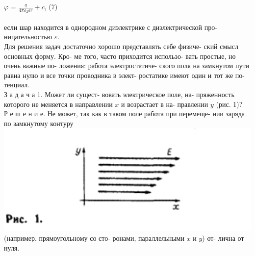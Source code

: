 \documentclass{memoir}
\begin{document}
\begin{multicols}{2}
\begin{small}
\begin{justify}

\parindent50pt
\indent $\varphi$ = $\frac{q}{4 \pi \varepsilon_2 \varepsilon r} + c$, \hfill (7) \\\\
если шар находится в однородном\linebreak
диэлектрике с диэлектрической про-\linebreak
ницательностью $\varepsilon$. \\
\parindent20pt
\indent Для решения задач достаточно\linebreak
хорошо представлять себе физиче-\linebreak
ский смысл основных форму. Кро-\linebreak
ме того, часто приходится использо-\linebreak
вать простые, но очень важные по-\linebreak
ложения: работа электростатиче-\linebreak
ского поля на замкнутом пути равна\linebreak
нулю и все точки проводника в элект-\linebreak
ростатике имеют один и тот же по-\linebreak
тенциал. \\
\indent З а д а ч а 1. Может ли сущест-\linebreak
вовать электрическое поле, на-\linebreak
пряженность которого не меняется\linebreak
в направлении $x$ и возрастает в на-\linebreak
правлении $y$ (рис. 1)? \\

\indent Р е ш е н и е. Не может, так как\linebreak
в таком поле работа при перемеще-\linebreak
нии заряда по замкнутому контуру \\

\includegraphics[scale=0.45]{pic1.png}\linebreak
(например, прямоугольному со сто-\linebreak
ронами, параллельными $x$ и $y$) от-\linebreak
лична от нуля. \\


\end{justify}
\end{small}
\end{multicols}
\end{document}
